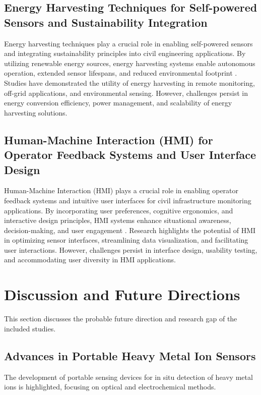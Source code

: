 \documentclass[journal, a4paper]{IEEEtran}
\begin{document}
\subsection{Energy Harvesting Techniques for Self-powered Sensors and Sustainability Integration}
Energy harvesting techniques play a crucial role in enabling self-powered sensors and integrating sustainability
principles into civil engineering applications. By utilizing renewable energy sources, energy harvesting systems
enable autonomous operation, extended sensor lifespans, and reduced environmental footprint \cite{han_crack_2021} \cite{yifei_structure_2023} \cite{bevan_automated_2022}.
Studies have demonstrated the utility of energy harvesting in remote monitoring, off-grid applications,
and environmental sensing. However, challenges persist in energy conversion efficiency, power management,
and scalability of energy harvesting solutions.

\subsection{Human-Machine Interaction (HMI) for Operator Feedback Systems and User Interface Design}
Human-Machine Interaction (HMI) plays a crucial role in enabling operator feedback systems and intuitive
user interfaces for civil infrastructure monitoring applications. By incorporating user preferences, cognitive
ergonomics, and interactive design principles, HMI systems enhance situational awareness, decision-making,
and user engagement \cite{yifei_structure_2023} \cite{bevan_automated_2022}. Research highlights the potential of HMI in optimizing sensor interfaces,
streamlining data visualization, and facilitating user interactions. However, challenges persist in interface
design, usability testing, and accommodating user diversity in HMI applications.


\section{Discussion and Future Directions} 
This section discusses the probable future direction and research gap of the included studies. 

\subsection{Advances in Portable Heavy Metal Ion Sensors}
The development of portable sensing devices for in situ detection of heavy metal ions is highlighted,
focusing on optical and electrochemical methods.
\end{document}
